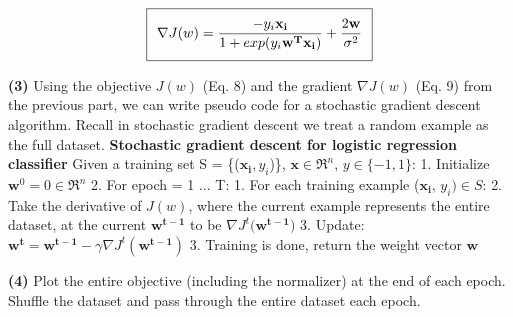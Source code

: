 \documentclass[11pt]{article}
\renewcommand\part[1]{\vspace{.10in}\textbf{(#1)}}
\begin{document}
\begin{equation}
\setlength\fboxsep{0.25cm}
\setlength\fboxrule{0.4pt}
\boxed{\nabla J(w) = \frac{-y_i\mathbf{x_i}}{1 + exp(y_i\mathbf{w^Tx_i})} + \frac{2\mathbf{w}}{\sigma^2}}
\end{equation}

\part{3} Using the objective $J(w)$ (Eq. 8) and the gradient $\nabla J(w)$ (Eq. 9) from the previous part, we can write pseudo code for a stochastic gradient descent algorithm. Recall in stochastic gradient descent we treat a random example as the full dataset.
\vspace{2mm} \break
{\Large \textbf{Stochastic gradient descent for logistic regression classifier}} \vspace{2mm} \break
{\large Given a training set S = \{($\mathbf{x_i}, y_i$)\}, $\mathbf{x} \in \Re^n$, $y \in \{-1, 1\}$:} \vspace{2mm} \break
{\large 1. \hspace{5mm} Initialize $\mathbf{w}^0 = 0 \in \Re^n$} \vspace{2mm} \break
{\large 2. \hspace{5mm} For epoch = 1 ... T:} \vspace{2mm} \break
{\large \hspace*{20mm} 1. For each training example ($\mathbf{x_i}$, $y_i) \in S$:} \vspace{2mm} \break
{\large \hspace*{20mm} 2. Take the derivative of $J(w)$, where the current example represents the entire}
{\large \hspace*{25mm} dataset, at the current $\mathbf{w^{t-1}}$ to be $\nabla J^t(\mathbf{w^{t-1})}$} \vspace{2mm} \break
{\large \hspace*{20mm} 3. Update: $\mathbf{w^t} = \mathbf{w^{t-1}} - \gamma \nabla J^t(\mathbf{w^{t-1}})$} \vspace{2mm} \break
{\large 3. Training is done, return the weight vector $\mathbf{w}$}

\part{4} Plot the entire objective (including the normalizer) at the end of each epoch. Shuffle the dataset and pass through the entire dataset each epoch.
\end{document}
